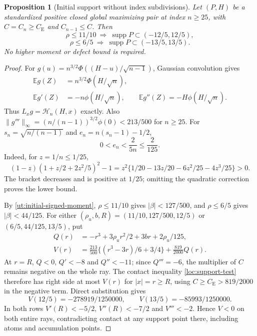 \documentclass[aop,preprint]{imsart}
\newtheorem{proposition}[theorem]{Proposition}
\theoremstyle{definition}
\newcommand{\CE}{C_{\mathrm E}}
\newcommand{\E}{\mathbb E}
\numberwithin{equation}{section}
\begin{document}
\begin{proposition}[Initial support without index subdivisions]\label{gc:initial-support}
Let $(P,H)$ be a standardized positive closed global maximizing pair
at index $n\ge25$, with $C=C_n\ge\CE$ and $C_{n-1}\le C$.
Then
\[
 \rho\le11/10\ \Longrightarrow\ \operatorname{supp}P\subset(-12/5,12/5),
\]
\[
 \rho\le6/5\ \Longrightarrow\ \operatorname{supp}P\subset(-13/5,13/5).
\]
No higher moment or defect bound is required.
\end{proposition}
\begin{proof}
For $g(u)=n^{3/2}\Phi((H-u)/\sqrt{n-1})$, Gaussian convolution gives
\begin{align*}
 \E g(Z)&=n^{3/2}\Phi(H/\sqrt n),\\
 \E g'(Z)&=-n\phi(H/\sqrt n),\qquad
 \E g''(Z)=-H\phi(H/\sqrt n).
\end{align*}
Thus $L_xg=\mathcal H_n(H,x)$ exactly. Also
$\|g'''\|_\infty=(n/(n-1))^{3/2}\phi(0)<213/500$ for $n\ge25$.
For $s_n=\sqrt{n/(n-1)}$ and $e_n=n(s_n-1)-1/2$,
\begin{equation}\label{gc:scale}
 0<e_n<\frac{2}{5n}\le\frac2{125}.
\end{equation}
Indeed, for $z=1/n\le1/25$,
\[
 (1-z)(1+z/2+2z^2/5)^2-1
 =z^2\{1/20-13z/20-6z^2/25-4z^3/25\}>0.
\]
The bracket decreases and is positive at $1/25$; omitting the
quadratic correction proves the lower bound.

By \eqref{ut:initial-signed-moment}, $\rho\le11/10$ gives
$|\beta|<127/500$, and $\rho\le6/5$ gives $|\beta|<44/125$.
For either $(\rho_u,b,R)=(11/10,127/500,12/5)$ or
$(6/5,44/125,13/5)$, put
\begin{align*}
 Q(r)&=-r^3+3\rho_ur^2/2+3br+2\rho_u/125,\\
 V(r)&=\frac{213}{500}\{(r^3-3r)/6+3/4\}
                                      +\frac{819}{2000}Q(r).
\end{align*}
At $r=R$, $Q<0$, $Q'<-8$ and $Q''<-11$; since $Q'''=-6$,
the multiplier of $C$ remains negative on the whole ray.
The contact inequality \eqref{loc:support-test} therefore has
right side at most $V(r)$ for $|x|=r\ge R$, using
$C\ge\CE>819/2000$ in the negative term. Direct substitution gives
\[
 V(12/5)=-278919/1250000,\qquad V(13/5)=-85993/1250000.
\]
In both rows $V'(R)<-5/2$, $V''(R)<-7/2$ and $V'''<-2$.
Hence $V<0$ on both entire rays, contradicting contact at any
support point there, including atoms and accumulation points.
\end{proof}
\end{document}
